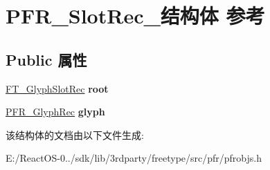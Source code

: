 \hypertarget{struct_p_f_r___slot_rec__}{}\section{P\+F\+R\+\_\+\+Slot\+Rec\+\_\+结构体 参考}
\label{struct_p_f_r___slot_rec__}
\subsection*{Public 属性}
\begin{DoxyCompactItemize}
\item 
\mbox{\label{struct_p_f_r___slot_rec___aedb79342ff3d90d9c694f5653d717fbe}} 
\hyperlink{struct_f_t___glyph_slot_rec__}{F\+T\+\_\+\+Glyph\+Slot\+Rec} {\bfseries root}
\item 
\mbox{\label{struct_p_f_r___slot_rec___a54b90014b57732fcb505c865920c7c4e}} 
\hyperlink{struct_p_f_r___glyph_rec__}{P\+F\+R\+\_\+\+Glyph\+Rec} {\bfseries glyph}
\end{DoxyCompactItemize}


该结构体的文档由以下文件生成\+:\begin{DoxyCompactItemize}
\item 
E\+:/\+React\+O\+S-\/0../sdk/lib/3rdparty/freetype/src/pfr/pfrobjs.\+h\end{DoxyCompactItemize}

